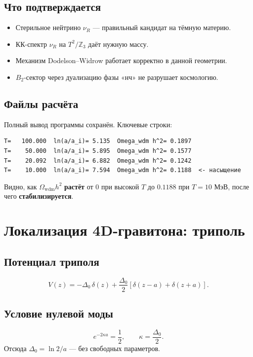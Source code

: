 \documentclass[11pt,letterpaper]{article}
\begin{document}
\subsection{Что подтверждается}
\begin{itemize}
\item Стерильное нейтрино $\nu_R$ --- правильный кандидат на тёмную материю.
\item КК-спектр $\nu_R$ на $T^2/\mathbb{Z}_3$ даёт нужную массу.
\item Механизм Dodelson--Widrow работает корректно в данной геометрии.
\item $B_2$-сектор через дуализацию фазы «нч» не разрушает космологию.
\end{itemize}

\subsection{Файлы расчёта}
Полный вывод программы сохранён. Ключевые строки:
\begin{verbatim}
T=   100.000  ln(a/a_i)= 5.135  Omega_wdm h^2= 0.1897
T=    50.000  ln(a/a_i)= 5.895  Omega_wdm h^2= 0.1577
T=    20.092  ln(a/a_i)= 6.882  Omega_wdm h^2= 0.1242
T=    10.000  ln(a/a_i)= 7.594  Omega_wdm h^2= 0.1188  <- насыщение
\end{verbatim}
Видно, как $\Omega_{\text{wdm}} h^2$ \textbf{растёт} от 0 при высокой $T$ до $0.1188$ при $T = 10$ МэВ, после чего \textbf{стабилизируется}.

\section{Локализация 4D-гравитона: триполь}
\label{sec:gravity-tripole}

\subsection{Потенциал триполя}
\begin{equation}
V(z) = -\Delta_0 \, \delta(z) + \frac{\Delta_0}{2} \left[ \delta(z - a) + \delta(z + a) \right].
\end{equation}

\subsection{Условие нулевой моды}
\begin{equation}
\boxed{\; e^{-2\kappa a} = \frac{1}{2}, \qquad \kappa = \frac{\Delta_0}{2}. \;}
\end{equation}
Отсюда $\Delta_0 = \ln 2 / a$ --- без свободных параметров.
\end{document}
